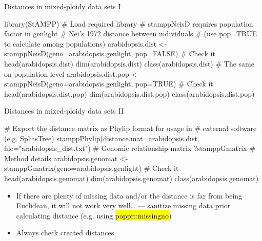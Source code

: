 \documentclass[compress, ucs, xelatex, 11pt, xcolor=svgnames,
  hyperref={
    bookmarks=true,
    unicode=true,
    colorlinks=true,
    pdftitle={Molecular data in R},
    plainpages=false,
    pdfauthor={Vojtech Zeisek},
    pdfsubject={Course about phylogeny and evolution in R},
    pdfcreator={XeLaTeX},
    pdfkeywords={R, evolution, phylogeny, molecular data},
    linkcolor=Tomato,
    anchorcolor=SaddleBrown,
    citecolor=Goldenrod,
    filecolor=DarkMagenta,
    menucolor=Sienna,
    urlcolor=DarkTurquoise,
    pdftex},
  url={hyphens, lowtilde} %
  ]{beamer}
\renewcommand{\texttt}[1]{\hl{\ttfamily #1}}
\begin{document}
\begin{frame}[fragile]{Distances in mixed-ploidy data sets I}
  \begin{spluscode}
    library(StAMPP) # Load required library
    # stamppNeisD requires population factor in genlight
    # Nei's 1972 distance between individuals
    # (use pop=TRUE to calculate among populations)
    arabidopsis.dist <- stamppNeisD(geno=arabidopsis.genlight, pop=FALSE)
    # Check it
    head(arabidopsis.dist)
    dim(arabidopsis.dist)
    class(arabidopsis.dist)
    # The same on population level
    arabidopsis.dist.pop <- stamppNeisD(geno=arabidopsis.genlight, pop=TRUE)
    # Check it
    head(arabidopsis.dist.pop)
    dim(arabidopsis.dist.pop)
    class(arabidopsis.dist.pop)
  \end{spluscode}
\end{frame}

\begin{frame}[fragile]{Distances in mixed-ploidy data sets II}
  \begin{spluscode}
    # Export the distance matrix as Phylip format for usage in
    # external software (e.g. SplitsTree)
    stamppPhylip(distance.mat=arabidopsis.dist, file="arabidopsis_dist.txt")
    # Genomic relationship matrix
    ?stamppGmatrix # Method details
    arabidopsis.genomat <- stamppGmatrix(geno=arabidopsis.genlight)
    # Check it
    head(arabidopsis.genomat)
    dim(arabidopsis.genomat)
    class(arabidopsis.genomat)
  \end{spluscode}
  \begin{itemize}
    \item If there are plenty of missing data and/or the distance is far from being Euclidean, it will not work very well\ldots{ } --- sanitize missing data prior calculating distance (e.g. using \texttt{poppr::missingno})
    \item Always check created distances
  \end{itemize}
\end{frame}
\end{document}
